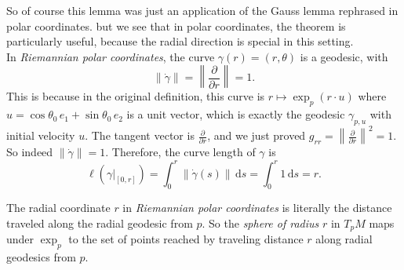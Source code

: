 

So of course this lemma was just an application of the Gauss lemma rephrased in polar coordinates. but we see that in polar coordinates, the theorem is particularly useful, because the radial direction is special in this setting.\\







In \emph{Riemannian polar coordinates}, the curve $\gamma(r) = (r, \theta)$ is a geodesic, with
\[
\|\dot{\gamma}\| = \left\|\frac{\partial}{\partial r}\right\| = 1.
\]
This is because in the original definition, this curve is $r \mapsto \exp_p(r \cdot u)$ where $u = \cos\theta_0 \, e_1 + \sin\theta_0 \, e_2$ is a unit vector, which is exactly the geodesic $\gamma_{p,u}$ with initial velocity $u$.
The tangent vector is $\frac{\partial}{\partial r}$, and we just proved $g_{rr} = \left\|\frac{\partial}{\partial r}\right\|^2 = 1$. So indeed $\|\dot{\gamma}\| = 1$. Therefore, the curve length of $\gamma$ is
\[
\ell(\gamma|_{[0,r]}) = \int_0^r \|\dot{\gamma}(s)\|\,\mathrm{d}s = \int_0^r 1\,\mathrm{d}s = r.
\]



The radial coordinate $r$ in \emph{Riemannian polar coordinates} is literally the distance traveled along the radial geodesic from $p$. So the \emph{sphere of radius} $r$ in $T_p M$ maps under $\exp_p$ to the set of points reached by traveling distance $r$ along radial geodesics from $p$.







